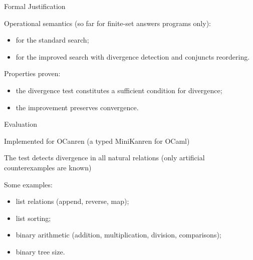 \documentclass{beamer}
\theoremstyle{definition}
\theoremstyle{plain} %
\begin{document}
\begin{frame}{Formal Justification}

Operational semantics (so far for finite-set answers programs only):
\vskip3mm

\begin{itemize}
  \item for the standard search;
  \item for the improved search with divergence detection and conjuncts reordering.
\end{itemize}
 
 \vskip8mm
 
 Properties proven:
 \vskip3mm
 \begin{itemize}
 \item the divergence test constitutes a sufficient condition for divergence;
 \item the improvement preserves convergence.
 \end{itemize}
 
\end{frame}

\begin{frame}{Evaluation}

Implemented for OCanren (a typed MiniKanren for OCaml)

\vskip8mm

The test detects divergence in all natural relations (only artificial counterexamples are known)

\vskip8mm

Some examples:
 
\begin{itemize}
 \item list relations (append, reverse, map);
 \item list sorting;
 \item binary arithmetic (addition, multiplication, division, comparisons);
 \item binary tree size.
\end{itemize}
 
\end{frame}
\end{document}
